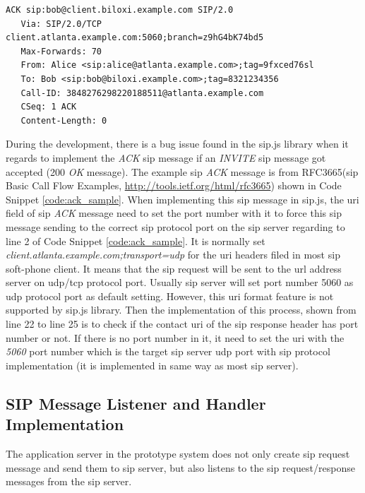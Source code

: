\begin{lstlisting}[caption={ACK Alice -> Bob Sample \cite{rfc:3665}},label={code:ack_sample}]
   ACK sip:bob@client.biloxi.example.com SIP/2.0
   Via: SIP/2.0/TCP client.atlanta.example.com:5060;branch=z9hG4bK74bd5
   Max-Forwards: 70
   From: Alice <sip:alice@atlanta.example.com>;tag=9fxced76sl
   To: Bob <sip:bob@biloxi.example.com>;tag=8321234356
   Call-ID: 3848276298220188511@atlanta.example.com
   CSeq: 1 ACK
   Content-Length: 0
\end{lstlisting}

\par During the development, there is a bug issue found in the sip.js library when it regards to implement the \textit{ACK} \gls{sip} message if an \textit{INVITE} \gls{sip} message got accepted (200 \textit{OK} message). The example \gls{sip} \textit{ACK} message is from RFC3665(\gls{sip} Basic Call Flow Examples, \url{http://tools.ietf.org/html/rfc3665}) shown in Code Snippet \ref{code:ack_sample}. When implementing this \gls{sip} message in sip.js, the \gls{uri} field of \gls{sip} \textit{ACK} message need to set the port number with it to force this \gls{sip} message sending to the correct \gls{sip} protocol port on the \gls{sip} server regarding to line 2 of Code Snippet \ref{code:ack_sample}. It is normally set \textit{client.atlanta.example.com;transport=udp} for the \gls{uri} headers filed in most \gls{sip} soft-phone client. It means that the \gls{sip} request will be sent to the \gls{url} address server on \gls{udp}/\gls{tcp} protocol port. Usually \gls{sip} server will set port number 5060 as \gls{udp} protocol port as default setting. However, this \gls{uri} format feature is not supported by sip.js library. Then the implementation of this process, shown from line 22 to line 25 is to check if the contact \gls{uri} of the \gls{sip} response header has port number or not. If there is no port number in it, it need to set the \gls{uri} with the \textit{5060} port number which is the target \gls{sip} server \gls{udp} port with \gls{sip} protocol implementation (it is implemented in same way as most \gls{sip} server).

\subsection{SIP Message Listener and Handler Implementation}

\par The application server in the prototype system does not only create \gls{sip} request message and send them to \gls{sip} server, but also listens to the \gls{sip} request/response messages from the \gls{sip} server.

